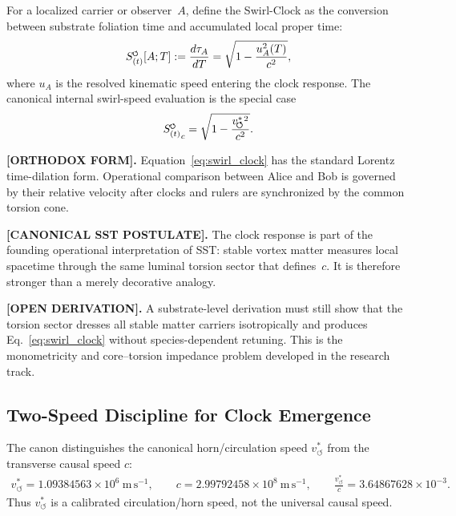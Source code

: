 \documentclass[11pt]{article}
\theoremstyle{definition}
\theoremstyle{plain}
\theoremstyle{remark}
\newcommand{\swirlarrow}{\mathchoice{\mkern-2mu\scriptstyle\boldsymbol{\circlearrowleft}}{\mkern-2mu\scriptstyle\boldsymbol{\circlearrowleft}}{\mkern-2mu\scriptscriptstyle\boldsymbol{\circlearrowleft}}{\mkern-2mu\scriptscriptstyle\boldsymbol{\circlearrowleft}}}
\newcommand{\SwirlClock}{{S_{(t)}^{\swirlarrow}}}
\newcommand{\vchar}{v_{\!\boldsymbol{\circlearrowleft}}^{\ast}}
\begin{document}
        For a localized carrier or observer~\(A\), define the Swirl-Clock as the conversion between substrate foliation time and accumulated local proper time:
        \begin{align}
            \SwirlClock[A;T]
            :=
            \frac{d\tau_A}{dT}
            =
            \sqrt{1-\frac{u_A^2(T)}{c^2}},
            \label{eq:swirl_clock}
        \end{align}
        where \(u_A\) is the resolved kinematic speed entering the clock response. The canonical internal swirl-speed evaluation is the special case
        \begin{align}
            \SwirlClock_c
            =
            \sqrt{1-\frac{\vchar{}^2}{c^2}}.
            \label{eq:swirl_clock_canonical_internal_evaluation}
        \end{align}

        \textbf{[ORTHODOX FORM].}
        Equation~\eqref{eq:swirl_clock} has the standard Lorentz time-dilation form. Operational comparison between Alice and Bob is governed by their relative velocity after clocks and rulers are synchronized by the common torsion cone.

        \textbf{[CANONICAL SST POSTULATE].}
        The clock response is part of the founding operational interpretation of SST: stable vortex matter measures local spacetime through the same luminal torsion sector that defines~\(c\). It is therefore stronger than a merely decorative analogy.

        \textbf{[OPEN DERIVATION].}
        A substrate-level derivation must still show that the torsion sector dresses all stable matter carriers isotropically and produces Eq.~\eqref{eq:swirl_clock} without species-dependent retuning. This is the monometricity and core--torsion impedance problem developed in the research track.

    \subsection{Two-Speed Discipline for Clock Emergence}
        \label{subsec:two_speed_clock_discipline}

        The canon distinguishes the canonical horn/circulation speed \(\vchar\) from the transverse causal speed \(c\):
        \begin{align}
            \vchar = 1.09384563\times 10^{6}\ \mathrm{m\,s^{-1}},
            \qquad
            c = 2.99792458\times 10^{8}\ \mathrm{m\,s^{-1}},
            \qquad
            \frac{\vchar}{c}=3.64867628\times10^{-3}.
        \end{align}
        Thus \(\vchar\) is a calibrated circulation/horn speed, not the universal causal speed.
\end{document}
